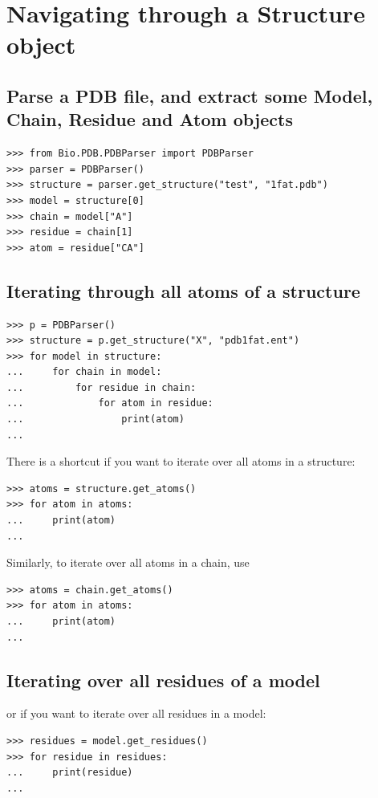\section{Navigating through a Structure object}

\subsection*{Parse a PDB file, and extract some Model, Chain, Residue and Atom objects}

\begin{verbatim}
>>> from Bio.PDB.PDBParser import PDBParser
>>> parser = PDBParser()
>>> structure = parser.get_structure("test", "1fat.pdb")
>>> model = structure[0]
>>> chain = model["A"]
>>> residue = chain[1]
>>> atom = residue["CA"]
\end{verbatim}

\subsection*{Iterating through all atoms of a structure}

\begin{verbatim}
>>> p = PDBParser()
>>> structure = p.get_structure("X", "pdb1fat.ent")
>>> for model in structure:
...     for chain in model:
...         for residue in chain:
...             for atom in residue:
...                 print(atom)
...
\end{verbatim}

There is a shortcut if you want to iterate over all atoms in a structure:
\begin{verbatim}
>>> atoms = structure.get_atoms()
>>> for atom in atoms:
...     print(atom)
...
\end{verbatim}

Similarly, to iterate over all atoms in a chain, use
\begin{verbatim}
>>> atoms = chain.get_atoms()
>>> for atom in atoms:
...     print(atom)
...
\end{verbatim}

\subsection*{Iterating over all residues of a model}

or if you want to iterate over all residues in a model:
\begin{verbatim}
>>> residues = model.get_residues()
>>> for residue in residues:
...     print(residue)
...
\end{verbatim}

